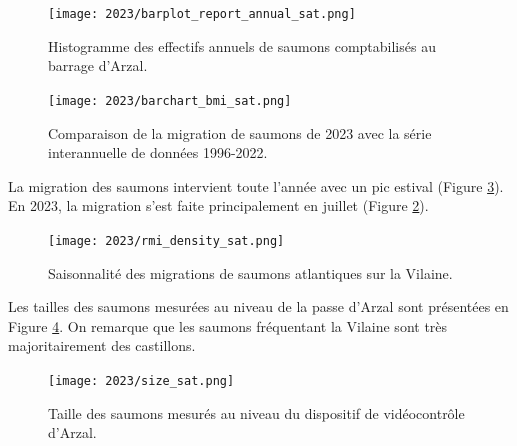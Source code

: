 \documentclass[11pt,twocolumn,titlepage,twoside]{article}\usepackage[]{graphicx}\usepackage[]{color}
\begin{document}
\begin{figure}[htpb]
\centering
\texttt{[image: 2023/barplot\_report\_annual\_sat.png]} 
\caption{Histogramme des effectifs annuels de saumons comptabilisés
au barrage d'Arzal.}
\label{barplot_report_annual_sat}
\end{figure}

\begin{figure}[htpb]
\centering
\texttt{[image: 2023/barchart\_bmi\_sat.png]} 
\caption{Comparaison de la migration de saumons de 2023 avec la
série interannuelle de données 1996-2022.}
\label{barchart_bmi_sat}
\end{figure}



La migration des saumons intervient toute l'année avec un pic estival (Figure
\ref{rmi_density_sat}). En 2023, la migration s'est faite principalement
en juillet (Figure \ref{barchart_bmi_sat}).

\begin{figure}[htpb]
\centering
\texttt{[image: 2023/rmi\_density\_sat.png]} 
\caption{Saisonnalité des migrations de saumons atlantiques sur la Vilaine.}
\label{rmi_density_sat}
\end{figure}


Les tailles des saumons mesurées au niveau de la passe d'Arzal sont présentées
en Figure \ref{size_sat}. On remarque que les saumons fréquentant la Vilaine sont très majoritairement des castillons.

\begin{figure}[htpb]
\centering
\texttt{[image: 2023/size\_sat.png]} 
\caption{Taille des saumons mesurés au niveau du dispositif de vidéocontrôle
d'Arzal.}
\label{size_sat}
\end{figure}





















\clearpage
\end{document}
